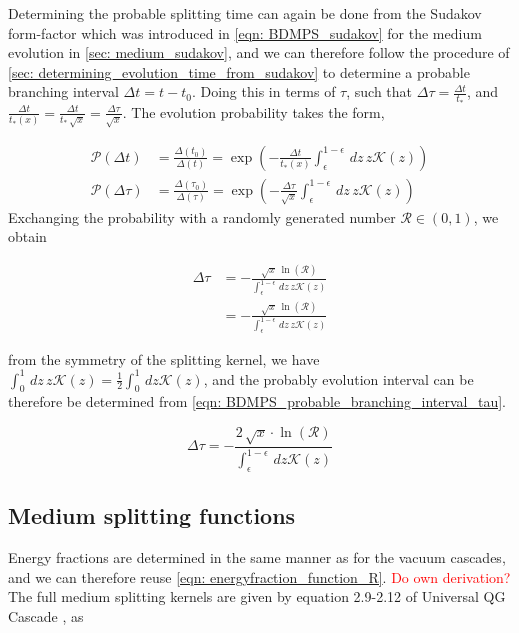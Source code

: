 \documentclass[main.tex]{subfiles}
\begin{document}
Determining the probable splitting time can again be done from the Sudakov form-factor which was introduced in \autoref{eqn: BDMPS_sudakov} for the medium evolution in \autoref{sec: medium_sudakov}, and we can therefore follow the procedure of \autoref{sec: determining_evolution_time_from_sudakov} to determine a probable branching interval \(\Delta t = t-t_0\). Doing this in terms of \(\tau\), such that \(\Delta \tau = \frac{\Delta t}{t_*}\), and  \(\frac{\Delta t}{t_*(x)} = \frac{\Delta t}{t_* \, \sqrt{x}} = \frac{\Delta \tau}{\sqrt{x}}\). The evolution probability takes the form,


\begin{align}
    \mathcal{P}(\Delta t) &= \frac{\Delta(t_0)}{\Delta(t)} = \exp \left(- \frac{\Delta t}{t_*(x)} \int_\epsilon^{1-\epsilon} \, dz\, z \mathcal{K}(z) \right) \nonumber \\
    \mathcal{P}(\Delta \tau) &= \frac{\Delta(\tau_0)}{\Delta(\tau)} = \exp \left(- \frac{\Delta \tau}{\sqrt{x}} \int_\epsilon^{1-\epsilon} \, dz\, z \mathcal{K}(z) \right)
\end{align}
Exchanging the probability with a randomly generated number \(\mathcal{R}\in (0,1)\), we obtain

\begin{align}
    \Delta \tau &= -\frac{\sqrt{x}\,\ln(\mathcal{R}) }{\int_\epsilon^{1-\epsilon} \, dz\, z \mathcal{K}(z)} \nonumber \\
    &= -\frac{\sqrt{x}\,\ln(\mathcal{R}) }{\int_\epsilon^{1-\epsilon} \, dz\, z \mathcal{K}(z)} 
\end{align}

from the symmetry of the splitting kernel, we have \(\int_0^1 \, dz\, z \mathcal{K}(z) = \frac{1}{2} \int_0^1 \, dz \mathcal{K}(z)\), and the probably evolution interval can be therefore be determined from \autoref{eqn: BDMPS_probable_branching_interval_tau}.

\begin{equation}\label{eqn: BDMPS_probable_branching_interval_tau}
    \Delta \tau = -\frac{2\, \sqrt{x}\cdot \ln(\mathcal{R}) }{\int_\epsilon^{1-\epsilon} \, dz \mathcal{K}(z)} 
\end{equation}

\subsection{Medium splitting functions}
Energy fractions are determined in the same manner as for the vacuum cascades, and we can therefore reuse \autoref{eqn: energyfraction_function_R}. 
\textcolor{red}{Do own derivation?}
The full medium splitting kernels are given by equation 2.9-2.12 of Universal QG Cascade  \cite{Universal_quark_gluon_ratio_in_medium-induced_parton_cascade}, as 
\end{document}
